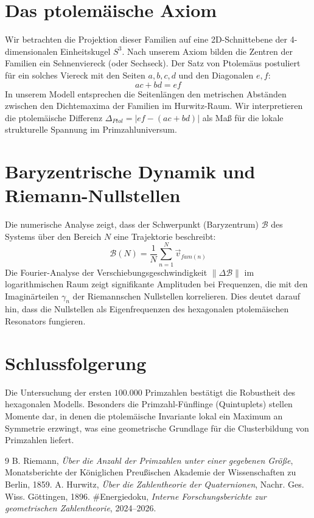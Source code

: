 \documentclass[11pt,a4paper]{article}
\begin{document}
	\section{Das ptolemäische Axiom}
	Wir betrachten die Projektion dieser Familien auf eine 2D-Schnittebene der 4-dimensionalen Einheitskugel $S^3$. Nach unserem Axiom bilden die Zentren der Familien ein Sehnenviereck (oder Sechseck). Der Satz von Ptolemäus postuliert für ein solches Viereck mit den Seiten $a, b, c, d$ und den Diagonalen $e, f$:
	\begin{equation}
		ac + bd = ef
	\end{equation}
	In unserem Modell entsprechen die Seitenlängen den metrischen Abständen zwischen den Dichtemaxima der Familien im Hurwitz-Raum. Wir interpretieren die ptolemäische Differenz $\Delta_{Ptol} = |ef - (ac + bd)|$ als Maß für die lokale strukturelle Spannung im Primzahluniversum.
	
	\section{Baryzentrische Dynamik und Riemann-Nullstellen}
	Die numerische Analyse zeigt, dass der Schwerpunkt (Baryzentrum) $\mathcal{B}$ des Systems über den Bereich $N$ eine Trajektorie beschreibt:
	\begin{equation}
		\mathcal{B}(N) = \frac{1}{N} \sum_{n=1}^N \vec{v}_{fam(n)}
	\end{equation}
	Die Fourier-Analyse der Verschiebungsgeschwindigkeit $\|\Delta \mathcal{B}\|$ im logarithmischen Raum zeigt signifikante Amplituden bei Frequenzen, die mit den Imaginärteilen $\gamma_n$ der Riemannschen Nullstellen korrelieren. Dies deutet darauf hin, dass die Nullstellen als Eigenfrequenzen des hexagonalen ptolemäischen Resonators fungieren.
	
	\section{Schlussfolgerung}
	Die Untersuchung der ersten $100.000$ Primzahlen bestätigt die Robustheit des hexagonalen Modells. Besonders die Primzahl-Fünflinge (Quintuplets) stellen Momente dar, in denen die ptolemäische Invariante lokal ein Maximum an Symmetrie erzwingt, was eine geometrische Grundlage für die Clusterbildung von Primzahlen liefert.
	
	\begin{thebibliography}{9}
		 B. Riemann, \textit{Über die Anzahl der Primzahlen unter einer gegebenen Größe}, Monatsberichte der Königlichen Preußischen Akademie der Wissenschaften zu Berlin, 1859.
		 A. Hurwitz, \textit{Über die Zahlentheorie der Quaternionen}, Nachr. Ges. Wiss. Göttingen, 1896.
		 #Energiedoku, \textit{Interne Forschungsberichte zur geometrischen Zahlentheorie}, 2024--2026.
	\end{thebibliography}
	
\end{document}
